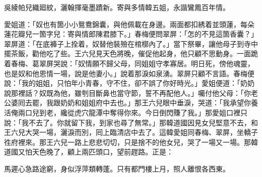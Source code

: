 吳綾帕兒織廻紋，灑翰揮毫墨蹟新。寄與多情韓五姐，永諧鸞鳳百年情。{}

愛姐道：「奴也有箇小小鴛鴦錦囊，與他佩載在身邊。兩面都扣綉着並頭蓮，每朵蓮花瓣兒一箇字兒：寄與情郎陳君膝下。」春梅便問翠屏：「怎的不見這箇香囊？」翠屏道：「在底褲子上拴着，奴替他裝殮在棺槨內了。」當下祭畢，讓他母子到寺中擺茶飯，勸他吃了些。王六兒見天色將晚，催促他起身，他只顧不思動身。一面跪着春梅、葛翠屏哭說：「奴情願不歸父母，同姐姐守孝寡居。明日死，傍他魂靈，也是奴和他恩情一場，說是他妻小。」說着那淚如泉湧。{}翠屏只顧不言語。春梅便說：「我的姐姐，只怕年小青春，守不住，卻不誤了你好時光。」愛姐便道：「奶奶說那裡話？奴既為他，雖刳目斷鼻也當守節，誓不再配他人。」囑付他父母：「你老公婆囘去罷，我跟奶奶和姐姐府中去也。」那王六兒眼中垂淚，哭道：「我承望你養活俺兩口兒到老，纔從虎穴龍潭中奪得你來。今日倒閃賺了我。」那愛姐口裡只說：「我不去了。你就留下我，到家也尋了無常。」{}那韓道國因見女兒堅意不去，和王六兒大哭一場，灑淚而別，囘上臨清店中去了。這韓愛姐同春梅、翠屏，坐轎子徃府裡來。那王六兒一路上悲悲切切，只是捨不的他女兒，哭了一場又一場。{}那韓道國又怕天色晚了，顧上兩匹頭口，望前趕路。正是：

馬遲心急路途窮，身似浮萍類轉蓬。只有都門樓上月，照人離恨各西東。

